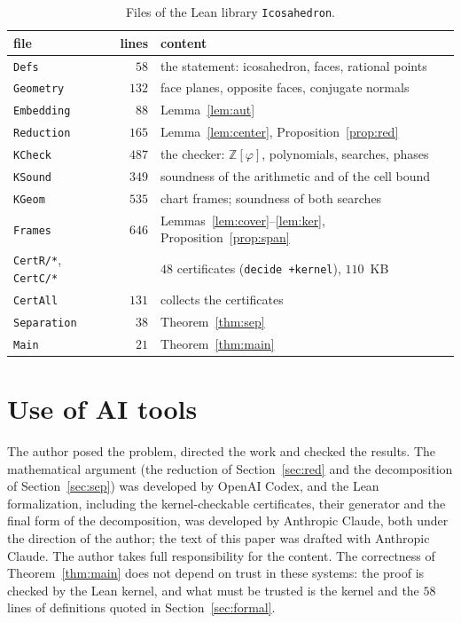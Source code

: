 \documentclass[11pt]{article}
\theoremstyle{definition}
\theoremstyle{remark}
\newcommand{\Z}{\mathbb{Z}}
\begin{document}
\begin{table}[ht]
\centering
\begin{tabular}{lrl}
\toprule
file & lines & content\\
\midrule
\texttt{Defs} & $58$ & the statement: icosahedron, faces, rational points\\
\texttt{Geometry} & $132$ & face planes, opposite faces, conjugate normals\\
\texttt{Embedding} & $88$ & Lemma~\ref{lem:aut}\\
\texttt{Reduction} & $165$ & Lemma~\ref{lem:center}, Proposition~\ref{prop:red}\\
\texttt{KCheck} & $487$ & the checker: $\Z[\varphi]$, polynomials, searches, phases\\
\texttt{KSound} & $349$ & soundness of the arithmetic and of the cell bound\\
\texttt{KGeom} & $535$ & chart frames; soundness of both searches\\
\texttt{Frames} & $646$ & Lemmas~\ref{lem:cover}--\ref{lem:ker}, Proposition~\ref{prop:span}\\
\texttt{CertR/*}, \texttt{CertC/*} & & $48$ certificates (\texttt{decide +kernel}), $110$~KB\\
\texttt{CertAll} & $131$ & collects the certificates\\
\texttt{Separation} & $38$ & Theorem~\ref{thm:sep}\\
\texttt{Main} & $21$ & Theorem~\ref{thm:main}\\
\bottomrule
\end{tabular}
\caption{Files of the Lean library \texttt{Icosahedron}.}
\label{tab:files}
\end{table}

\section*{Use of AI tools}

The author posed the problem, directed the work and checked the results. The mathematical argument
(the reduction of Section~\ref{sec:red} and the decomposition of Section~\ref{sec:sep}) was developed
by OpenAI Codex, and the Lean formalization, including the
kernel-checkable certificates, their generator and the final form of the decomposition, was developed by
Anthropic Claude, both under the direction of the author; the text of this paper was drafted with
Anthropic Claude. The author takes full responsibility for the content. The correctness of
Theorem~\ref{thm:main} does not depend on trust in these systems: the proof is checked by the Lean
kernel, and what must be trusted is the kernel and the $58$ lines of definitions quoted in
Section~\ref{sec:formal}.
\end{document}
